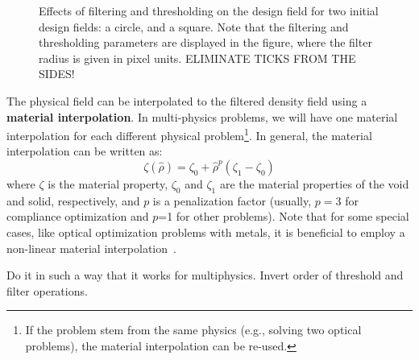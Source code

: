     \begin{figure}[tb]
        \centering

        \caption{Effects of filtering and thresholding on the design field for two initial design fields: a circle,
        and a square. Note that the filtering and thresholding parameters are displayed in the figure, where the filter radius
        is given in pixel units. ELIMINATE TICKS FROM THE SIDES!}
        \label{fig:ft}
    \end{figure}

    The physical field can be interpolated to the filtered density field using a
    \textbf{material interpolation}.
    In multi-physics problems, we will have one material interpolation for each
    different physical problem\footnote{If the problem stem from the same physics
        (e.g., solving two optical problems), the material interpolation can be
        re-used.}.
    In general, the material interpolation can be written as:
    \begin{equation}
        \zeta(\hat{\rho})=\zeta_0+\hat{\rho}^p\left(\zeta_1-\zeta_0\right)
    \end{equation}
    where $\zeta$ is the material property, $\zeta_0$ and $\zeta_1$ are the
    material properties of the void and solid, respectively, and $p$
    is a penalization factor (usually, $p=3$ for compliance optimization and $p$=1
    for other problems). Note that for some
    special cases, like optical optimization problems with metals, it is beneficial
    to employ a non-linear material interpolation~\cite{nonlinear_interp}.

    Do it in such a way that it works for multiphysics.
    Invert order of threshold and filter operations.

